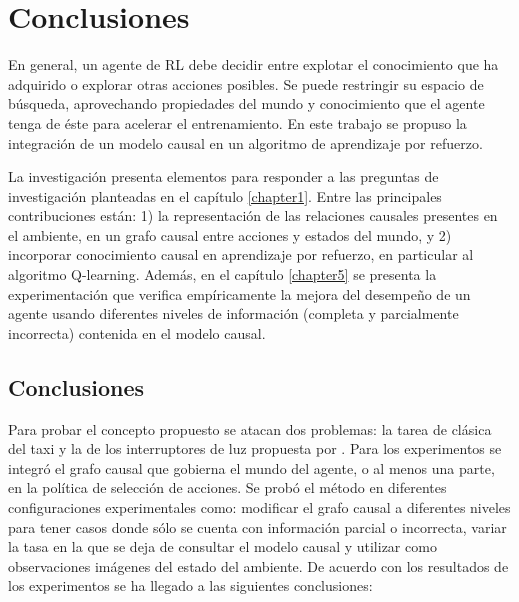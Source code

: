 \chapter{Conclusiones}\label{chapter6}

\graphicspath{{Chapter5/Figs/}}


En general, un agente de RL debe decidir entre explotar el conocimiento que ha adquirido o explorar otras acciones posibles. Se puede restringir su espacio de búsqueda, aprovechando 
propiedades del mundo y conocimiento que el agente tenga
de éste para acelerar el entrenamiento.
En este trabajo se propuso la integración de un modelo causal en un
algoritmo de aprendizaje por refuerzo.

La investigación presenta
elementos para responder a las preguntas de investigación planteadas en el capítulo \ref{chapter1}. Entre las principales contribuciones están: 1) la representación de las relaciones causales presentes en el ambiente, en un grafo causal entre acciones y estados del mundo, y 2) incorporar conocimiento causal en aprendizaje por refuerzo, en particular al
algoritmo Q-learning.
Además, en el capítulo \ref{chapter5} se presenta la experimentación que verifica empíricamente
    la mejora del desempeño de un agente usando diferentes niveles de información (completa y parcialmente incorrecta) contenida en el modelo causal. 

\section{Conclusiones}

Para probar el concepto propuesto se atacan dos problemas: la tarea de clásica del taxi \cite{Dietterich:2000:HRL:1622262.1622268} y la de los
interruptores de luz propuesta por \cite{nair2019causal}.
Para los experimentos se integró el grafo causal que gobierna el mundo del agente, o al menos una parte, en la política de selección de acciones. Se probó el método en diferentes configuraciones experimentales como: modificar el grafo causal a diferentes niveles para tener casos donde sólo se cuenta con información parcial o incorrecta, variar la tasa en la que se deja de consultar el modelo causal y utilizar como observaciones imágenes del estado del ambiente. De acuerdo con los resultados de los experimentos se ha llegado a las siguientes conclusiones:
    
